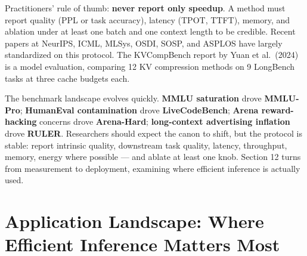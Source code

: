 Practitioners' rule of thumb: \textbf{never report only speedup}. A method must report quality (PPL or task accuracy), latency (TPOT, TTFT), memory, and ablation under at least one batch and one context length to be credible. Recent papers at NeurIPS, ICML, MLSys, OSDI, SOSP, and ASPLOS have largely standardized on this protocol. The KVCompBench report by Yuan et al.~(2024) is a model evaluation, comparing 12 KV compression methods on 9 LongBench tasks at three cache budgets each.

The benchmark landscape evolves quickly. \textbf{MMLU saturation} drove \textbf{MMLU-Pro}; \textbf{HumanEval contamination} drove \textbf{LiveCodeBench}; \textbf{Arena reward-hacking} concerns drove \textbf{Arena-Hard}; \textbf{long-context advertising inflation} drove \textbf{RULER}. Researchers should expect the canon to shift, but the protocol is stable: report intrinsic quality, downstream task quality, latency, throughput, memory, energy where possible --- and ablate at least one knob. Section 12 turns from measurement to deployment, examining where efficient inference is actually used.

\section{Application Landscape: Where Efficient Inference Matters Most}\label{application-landscape-where-efficient-inference-matters-most}

